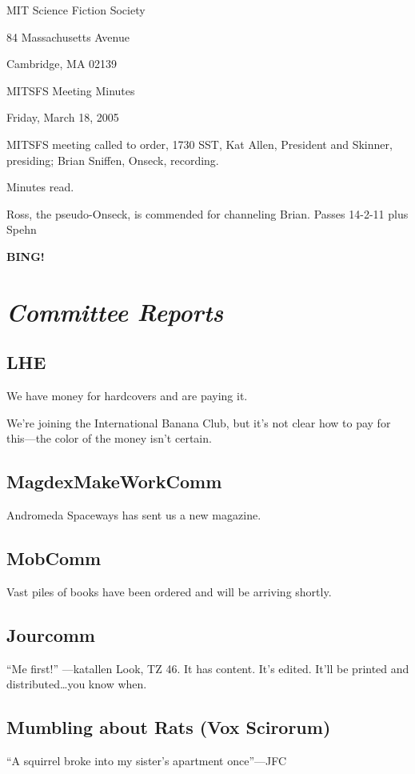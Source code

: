 \documentclass[10pt]{article}
\newcommand{\bing}{{\bf BING!} }
\newcommand{\goto}[1]{\bing \vskip 12pt \section*{{\em{#1}}}}
\newcommand{\ps}{ plus Spehn\xspace}
\begin{document}
\begin{center}

MIT Science Fiction Society

84 Massachusetts Avenue

Cambridge, MA 02139

\vspace{12pt}

MITSFS Meeting Minutes

Friday, March 18, 2005

\end{center}

\vspace{18pt}

\setlength{\parskip}{6pt}

\noindent
MITSFS meeting called to order, 1730 SST, Kat Allen, President and
Skinner, presiding; Brian Sniffen,  Onseck, recording.

Minutes read.

Ross, the pseudo-Onseck, is commended for channeling Brian. Passes 14-2-11\ps

\goto{Committee Reports}
\subsection*{LHE}
We have money for hardcovers and are paying it.

We're joining the International Banana Club, but it's not clear how to
pay for this---the color of the money isn't certain.

\subsection*{MagdexMakeWorkComm}
Andromeda Spaceways has sent us a new magazine.

\subsection*{MobComm}
Vast piles of books have been ordered and will be arriving shortly.

\subsection*{Jourcomm}
``Me first!'' ---katallen
Look, TZ 46.  It has content.  It's edited.  It'll be printed and
distributed\dots you know when.

\subsection*{Mumbling about Rats (Vox Scirorum)}
``A squirrel broke into my sister's apartment once''---JFC
\end{document}
